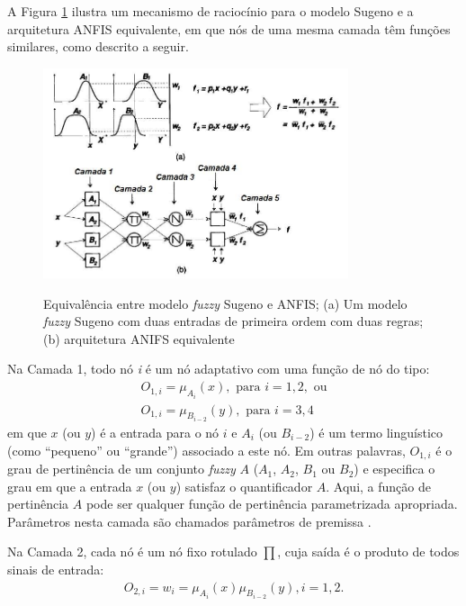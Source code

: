 A Figura \ref{fig:anfis} ilustra um mecanismo de raciocínio para o modelo Sugeno e a arquitetura ANFIS equivalente, em que nós de uma mesma camada têm funções similares, como descrito a seguir.
\begin{figure}[!htb]
    \centering
    \caption{Equivalência entre modelo \textit{fuzzy} Sugeno e ANFIS; (a) Um modelo \textit{fuzzy} Sugeno com duas entradas de primeira ordem com duas regras; (b) arquitetura ANIFS equivalente}
    \includegraphics[width=0.8\textwidth]{./04-figuras/fund_teorica/anfis_traduzido}
    \label{fig:anfis}
\end{figure}

Na Camada 1, todo nó \textit{i} é um nó adaptativo com uma função de nó do tipo:
\begin{align*}
    O_{1,i} = \mu_{A_{i}}(x), \mbox{ para } i = 1, 2, \mbox{ ou}\\
    O_{1,i} = \mu_{B_{i-2}}(y), \mbox{ para } i = 3, 4
\end{align*}
em que $x$ (ou $y$) é a entrada para o nó $i$ e $A_{i}$ (ou $B_{i-2}$) é um termo linguístico (como ``pequeno'' ou ``grande'') associado a este nó. Em outras palavras, $O_{1,i}$ é o grau de pertinência de um conjunto \textit{fuzzy} $A$ ($A_1$, $A_2$, $B_1$ ou $B_2$) e especifica o grau em que a entrada $x$ (ou $y$) satisfaz o quantificador $A$. Aqui, a função de pertinência $A$ pode ser qualquer função de pertinência parametrizada apropriada. Parâmetros nesta camada são chamados parâmetros de premissa \cite[p.~336]{Jang1997}.

Na Camada 2, cada nó é um nó fixo rotulado $\prod$, cuja saída é o produto de todos sinais de entrada:
\begin{align*}
    O_{2,i} = w_i = \mu_{A_{i}}(x)\mu_{B_{i-2}}(y), i = 1, 2.
\end{align*}

